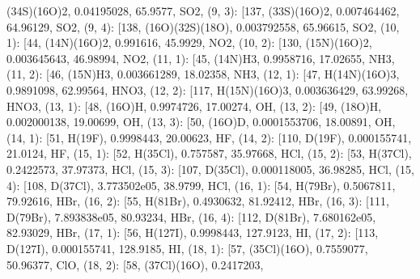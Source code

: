 \documentclass[letterpaper,10pt,english]{sphinxmanual}
\begin{document}
\begin{fulllineitems}
\textquotesingle{}(34S)(16O)2\textquotesingle{}, 0.04195028, 65.9577, \textquotesingle{}SO2\textquotesingle{}{]}, (9, 3): {[}137, \textquotesingle{}(33S)(16O)2\textquotesingle{}, 0.007464462, 64.96129, \textquotesingle{}SO2\textquotesingle{}{]}, (9, 4): {[}138, \textquotesingle{}(16O)(32S)(18O)\textquotesingle{}, 0.003792558, 65.96615, \textquotesingle{}SO2\textquotesingle{}{]}, (10, 1): {[}44, \textquotesingle{}(14N)(16O)2\textquotesingle{}, 0.991616, 45.9929, \textquotesingle{}NO2\textquotesingle{}{]}, (10, 2): {[}130, \textquotesingle{}(15N)(16O)2\textquotesingle{}, 0.003645643, 46.98994, \textquotesingle{}NO2\textquotesingle{}{]}, (11, 1): {[}45, \textquotesingle{}(14N)H3\textquotesingle{}, 0.9958716, 17.02655, \textquotesingle{}NH3\textquotesingle{}{]}, (11, 2): {[}46, \textquotesingle{}(15N)H3\textquotesingle{}, 0.003661289, 18.02358, \textquotesingle{}NH3\textquotesingle{}{]}, (12, 1): {[}47, \textquotesingle{}H(14N)(16O)3\textquotesingle{}, 0.9891098, 62.99564, \textquotesingle{}HNO3\textquotesingle{}{]}, (12, 2): {[}117, \textquotesingle{}H(15N)(16O)3\textquotesingle{}, 0.003636429, 63.99268, \textquotesingle{}HNO3\textquotesingle{}{]}, (13, 1): {[}48, \textquotesingle{}(16O)H\textquotesingle{}, 0.9974726, 17.00274, \textquotesingle{}OH\textquotesingle{}{]}, (13, 2): {[}49, \textquotesingle{}(18O)H\textquotesingle{}, 0.002000138, 19.00699, \textquotesingle{}OH\textquotesingle{}{]}, (13, 3): {[}50, \textquotesingle{}(16O)D\textquotesingle{}, 0.0001553706, 18.00891, \textquotesingle{}OH\textquotesingle{}{]}, (14, 1): {[}51, \textquotesingle{}H(19F)\textquotesingle{}, 0.9998443, 20.00623, \textquotesingle{}HF\textquotesingle{}{]}, (14, 2): {[}110, \textquotesingle{}D(19F)\textquotesingle{}, 0.000155741, 21.0124, \textquotesingle{}HF\textquotesingle{}{]}, (15, 1): {[}52, \textquotesingle{}H(35Cl)\textquotesingle{}, 0.757587, 35.97668, \textquotesingle{}HCl\textquotesingle{}{]}, (15, 2): {[}53, \textquotesingle{}H(37Cl)\textquotesingle{}, 0.2422573, 37.97373, \textquotesingle{}HCl\textquotesingle{}{]}, (15, 3): {[}107, \textquotesingle{}D(35Cl)\textquotesingle{}, 0.000118005, 36.98285, \textquotesingle{}HCl\textquotesingle{}{]}, (15, 4): {[}108, \textquotesingle{}D(37Cl)\textquotesingle{}, 3.773502e\sphinxhyphen{}05, 38.9799, \textquotesingle{}HCl\textquotesingle{}{]}, (16, 1): {[}54, \textquotesingle{}H(79Br)\textquotesingle{}, 0.5067811, 79.92616, \textquotesingle{}HBr\textquotesingle{}{]}, (16, 2): {[}55, \textquotesingle{}H(81Br)\textquotesingle{}, 0.4930632, 81.92412, \textquotesingle{}HBr\textquotesingle{}{]}, (16, 3): {[}111, \textquotesingle{}D(79Br)\textquotesingle{}, 7.893838e\sphinxhyphen{}05, 80.93234, \textquotesingle{}HBr\textquotesingle{}{]}, (16, 4): {[}112, \textquotesingle{}D(81Br)\textquotesingle{}, 7.680162e\sphinxhyphen{}05, 82.93029, \textquotesingle{}HBr\textquotesingle{}{]}, (17, 1): {[}56, \textquotesingle{}H(127I)\textquotesingle{}, 0.9998443, 127.9123, \textquotesingle{}HI\textquotesingle{}{]}, (17, 2): {[}113, \textquotesingle{}D(127I)\textquotesingle{}, 0.000155741, 128.9185, \textquotesingle{}HI\textquotesingle{}{]}, (18, 1): {[}57, \textquotesingle{}(35Cl)(16O)\textquotesingle{}, 0.7559077, 50.96377, \textquotesingle{}ClO\textquotesingle{}{]}, (18, 2): {[}58, \textquotesingle{}(37Cl)(16O)\textquotesingle{}, 0.2417203, 
\end{fulllineitems}
\end{document}
